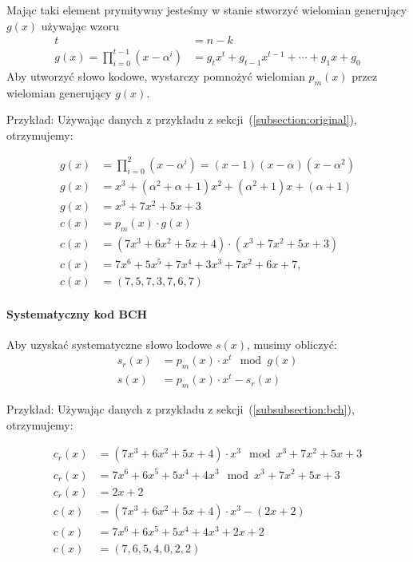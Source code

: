 Mając taki element prymitywny jesteśmy w stanie stworzyć wielomian generujący $g(x)$ używając wzoru
\begin{align*}
    t &= n - k \\
    g(x) = \prod_{i=0}^{t-1} (x - \alpha^i) &= g_{t}x^t + g_{t-1}x^{t-1} +
    \cdots + g_{1}x + g_{0}
\end{align*}
Aby utworzyć słowo kodowe, wystarczy pomnożyć wielomian $p_m(x)$ przez wielomian generujący $g(x)$.
\newline
\newline
\begin{minipage}{\textwidth}
Przykład:
\newline
Używając danych z przykładu z sekcji~(\ref{subsection:original}), otrzymujemy:
\end{minipage}
\begin{align*}
    g(x) &= \prod_{i=0}^{2} (x - \alpha^i) = (x - 1)(x - \alpha)(x - \alpha^2) \\
    g(x) &= x^3 + (\alpha^2 + \alpha + 1)x^2 + (\alpha^2 + 1)x + (\alpha + 1) \\
    g(x) &= x^3 + 7x^2 + 5x + 3 \\
    c(x) &= p_m(x) \cdot g(x) \\
    c(x) &= (7x^3 + 6x^2 + 5x + 4) \cdot (x^3 + 7x^2 + 5x + 3) \\
    c(x) &= 7x^6 + 5x^5 + 7x^4 + 3x^3 + 7x^2 + 6x + 7, \\
    c(x) &= (7,5,7,3,7,6,7)
\end{align*}

\paragraph{Systematyczny kod BCH}\label{systematic-bch-rs}

Aby uzyskać systematyczne słowo kodowe $s(x)$, musimy obliczyć:
\begin{align*}
    s_r(x) &= p_m(x) \cdot x^t \mod g(x) \\
    s(x) &= p_m(x) \cdot x^t - s_r(x)
\end{align*}
\begin{minipage}{\textwidth}
Przykład:
\newline
Używając danych z przykładu z sekcji~(\ref{subsubsection:bch}), otrzymujemy:
\end{minipage}
\begin{align*}
    c_r(x) &= (7x^3 + 6x^2 + 5x + 4) \cdot x^3 \mod x^3 + 7x^2 + 5x + 3 \\
    c_r(x) &= 7x^6 + 6x^5 + 5x^4 + 4x^3 \mod x^3 + 7x^2 + 5x + 3 \\
    c_r(x) &= 2x + 2 \\
    c(x) &= (7x^3 + 6x^2 + 5x + 4) \cdot x^3 - (2x + 2) \\
    c(x) &= 7x^6 + 6x^5 + 5x^4 + 4x^3 + 2x + 2 \\
    c(x) &= (7,6,5,4,0,2,2)
\end{align*}

